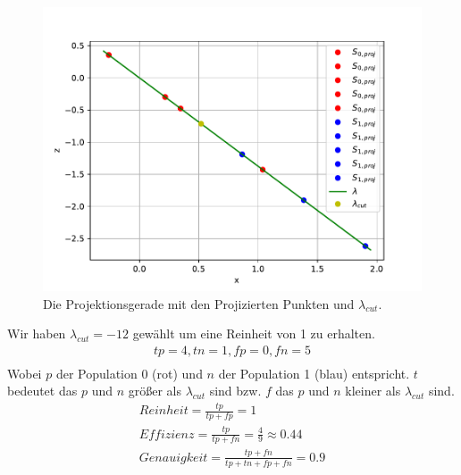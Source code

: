 \begin{figure}[H]
  \includegraphics[width=\linewidth]{Python/Aufgabe3e.pdf}
  \caption{Die Projektionsgerade mit den Projizierten Punkten und $\lambda_{cut}$.}
\end{figure}
Wir haben $\lambda_{cut} = -12$ gewählt um eine Reinheit von 1 zu erhalten.
\begin{align*}
  tp = 4, tn = 1, fp = 0, fn = 5 \\
\end{align*}
Wobei $p$ der Population 0 (rot) und $n$ der Population 1 (blau) entspricht. $t$ bedeutet das $p$ und $n$ größer als $\lambda_{cut}$ sind bzw. $f$ das $p$ und $n$ kleiner als $\lambda_{cut}$ sind.
\begin{align*}
  Reinheit = \frac{tp}{tp + fp} = 1 \\
  Effizienz = \frac{tp}{tp + fn} = \frac{4}{9} \approx 0.44 \\
  Genauigkeit = \frac{tp + fn}{tp + tn + fp + fn} = 0.9
\end{align*}
